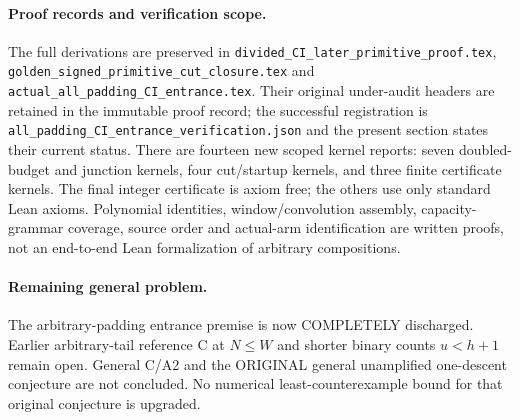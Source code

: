 \paragraph{Proof records and verification scope.}
The full derivations are preserved in
\texttt{divided\_CI\_later\_primitive\_proof.tex},
\texttt{golden\_signed\_primitive\_cut\_closure.tex} and
\texttt{actual\_all\_padding\_CI\_entrance.tex}. Their original
under-audit headers are retained in the immutable proof record;
the successful registration is
\texttt{all\_padding\_CI\_entrance\_verification.json} and the
present section states their current status.
There are fourteen new scoped kernel reports: seven doubled-budget
and junction kernels, four cut/startup kernels, and three finite
certificate kernels. The final integer certificate is axiom free;
the others use only standard Lean axioms. Polynomial identities,
window/convolution assembly, capacity-grammar coverage, source order
and actual-arm identification are written proofs, not an end-to-end
Lean formalization of arbitrary compositions.

\paragraph{Remaining general problem.}
The arbitrary-padding entrance premise is now COMPLETELY discharged.
Earlier arbitrary-tail reference C at $N\le W$ and shorter binary
counts $u<h+1$ remain open. General C/A2 and the ORIGINAL general
unamplified one-descent conjecture are not concluded. No numerical
least-counterexample bound for that original conjecture is upgraded.
